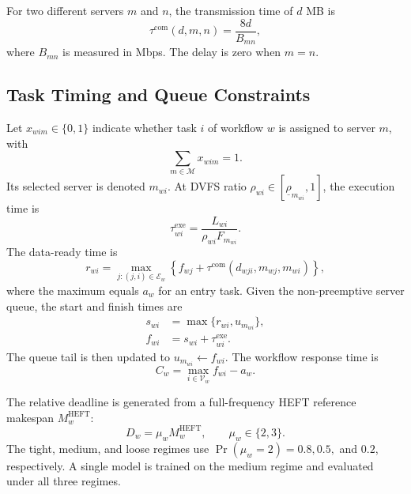\documentclass[lettersize,journal]{IEEEtran}
\begin{document}
For two different servers $m$ and $n$, the transmission time of $d$ MB is
\begin{equation}
  \tau^{\mathrm{com}}(d,m,n)=\frac{8d}{B_{mn}},
  \label{eq:communication}
\end{equation}
where $B_{mn}$ is measured in Mbps. The delay is zero when $m=n$.

\subsection{Task Timing and Queue Constraints}
Let $x_{wim}\in\{0,1\}$ indicate whether task $i$ of workflow $w$ is assigned
to server $m$, with
\begin{equation}
  \sum_{m\in\mathcal{M}}x_{wim}=1.
  \label{eq:assignment}
\end{equation}
Its selected server is denoted $m_{wi}$. At DVFS ratio
$\rho_{wi}\in[\underline\rho_{m_{wi}},1]$, the execution time is
\begin{equation}
  \tau^{\mathrm{exe}}_{wi}=\frac{L_{wi}}{\rho_{wi}F_{m_{wi}}}.
  \label{eq:execution}
\end{equation}
The data-ready time is
\begin{equation}
 r_{wi}=\max_{j:(j,i)\in\mathcal{E}_w}
 \left\{f_{wj}+\tau^{\mathrm{com}}(d_{wji},m_{wj},m_{wi})\right\},
 \label{eq:ready}
\end{equation}
where the maximum equals $a_w$ for an entry task. Given the non-preemptive
server queue, the start and finish times are
\begin{align}
 s_{wi}&=\max\{r_{wi},u_{m_{wi}}\}, \label{eq:start}\\
 f_{wi}&=s_{wi}+\tau^{\mathrm{exe}}_{wi}. \label{eq:finish}
\end{align}
The queue tail is then updated to $u_{m_{wi}}\leftarrow f_{wi}$. The workflow
response time is
\begin{equation}
 C_w=\max_{i\in\mathcal{V}_w} f_{wi}-a_w.
 \label{eq:response}
\end{equation}

The relative deadline is generated from a full-frequency HEFT reference
makespan $M_w^{\mathrm{HEFT}}$:
\begin{equation}
 D_w=\mu_w M_w^{\mathrm{HEFT}},\qquad \mu_w\in\{2,3\}.
 \label{eq:deadline}
\end{equation}
The tight, medium, and loose regimes use
$\Pr(\mu_w=2)=0.8,0.5,$ and $0.2$, respectively. A single model is trained on
the medium regime and evaluated under all three regimes.
\end{document}

